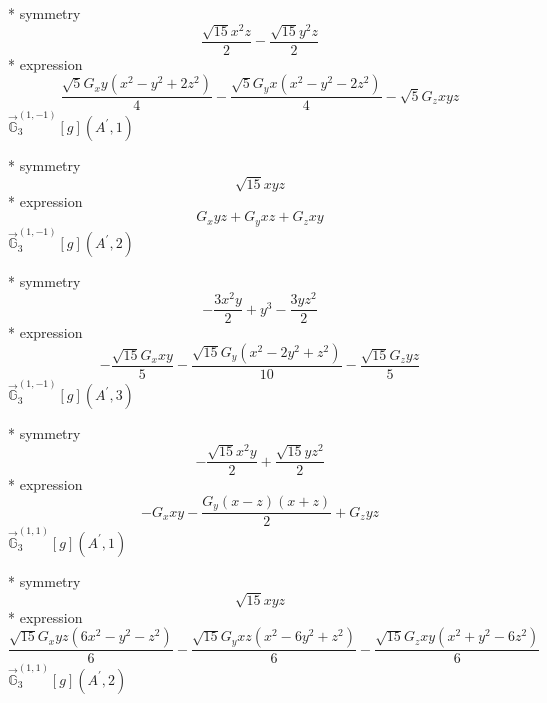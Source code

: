 \documentclass[fleqn,8pt]{jsarticle}
\begin{document}
\noindent\quad ** symmetry
\begin{dmath*}
\frac{\sqrt{15} x^{2} z}{2} - \frac{\sqrt{15} y^{2} z}{2}
\end{dmath*}
\noindent\quad ** expression
\begin{dmath*}
\frac{\sqrt{5} G_{x} y \left(x^{2} - y^{2} + 2 z^{2}\right)}{4} - \frac{\sqrt{5} G_{y} x \left(x^{2} - y^{2} - 2 z^{2}\right)}{4} - \sqrt{5} G_{z} x y z
\end{dmath*}
\noindent\quad $\vec{\mathbb{G}}_{3}^{(1,-1)}[g](A^{\prime},1)$

\noindent\quad ** symmetry
\begin{dmath*}
\sqrt{15} x y z
\end{dmath*}
\noindent\quad ** expression
\begin{dmath*}
G_{x} y z + G_{y} x z + G_{z} x y
\end{dmath*}
\noindent\quad $\vec{\mathbb{G}}_{3}^{(1,-1)}[g](A^{\prime},2)$

\noindent\quad ** symmetry
\begin{dmath*}
- \frac{3 x^{2} y}{2} + y^{3} - \frac{3 y z^{2}}{2}
\end{dmath*}
\noindent\quad ** expression
\begin{dmath*}
- \frac{\sqrt{15} G_{x} x y}{5} - \frac{\sqrt{15} G_{y} \left(x^{2} - 2 y^{2} + z^{2}\right)}{10} - \frac{\sqrt{15} G_{z} y z}{5}
\end{dmath*}
\noindent\quad $\vec{\mathbb{G}}_{3}^{(1,-1)}[g](A^{\prime},3)$

\noindent\quad ** symmetry
\begin{dmath*}
- \frac{\sqrt{15} x^{2} y}{2} + \frac{\sqrt{15} y z^{2}}{2}
\end{dmath*}
\noindent\quad ** expression
\begin{dmath*}
- G_{x} x y - \frac{G_{y} \left(x - z\right) \left(x + z\right)}{2} + G_{z} y z
\end{dmath*}
\noindent\quad $\vec{\mathbb{G}}_{3}^{(1,1)}[g](A^{\prime},1)$

\noindent\quad ** symmetry
\begin{dmath*}
\sqrt{15} x y z
\end{dmath*}
\noindent\quad ** expression
\begin{dmath*}
\frac{\sqrt{15} G_{x} y z \left(6 x^{2} - y^{2} - z^{2}\right)}{6} - \frac{\sqrt{15} G_{y} x z \left(x^{2} - 6 y^{2} + z^{2}\right)}{6} - \frac{\sqrt{15} G_{z} x y \left(x^{2} + y^{2} - 6 z^{2}\right)}{6}
\end{dmath*}
\noindent\quad $\vec{\mathbb{G}}_{3}^{(1,1)}[g](A^{\prime},2)$
\end{document}
